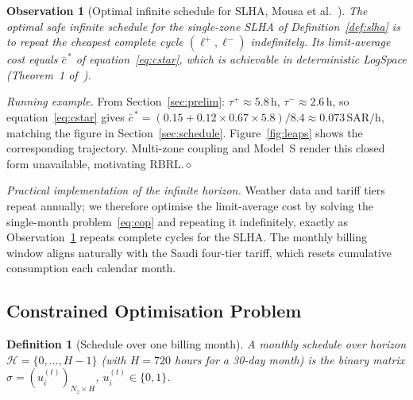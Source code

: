 \documentclass[12pt,a4paper]{article}
\let\oldsubsection\subsection
\renewcommand{\subsection}[1]{\FloatBarrier\oldsubsection{#1}}
\newtheorem{definition}{Definition}
\newtheorem{observation}{Observation}
\newcommand{\sched}{\sigma}
\newcommand{\SAR}{\text{SAR}}
\newcommand{\taup}{\tau^{+}}
\newcommand{\taum}{\tau^{-}}
\begin{document}
\begin{observation}[Optimal infinite schedule for SLHA, Mousa et al.~\cite{Mousa2018}]
\label{obs:optimal}
The optimal safe infinite schedule for the single-zone SLHA of
Definition~\ref{def:slha} is to repeat the cheapest complete cycle
$(\ell^+,\ell^-)$ indefinitely.
Its limit-average cost equals $\bar{c}^{\,*}$ of equation~\eqref{eq:cstar},
which is achievable in deterministic LogSpace (Theorem~1 of~\cite{Mousa2018}).
\end{observation}

\noindent\textit{Running example.}\;
From Section~\ref{sec:prelim}: $\taup{\approx}5.8\,\text{h}$,
$\taum{\approx}2.6\,\text{h}$, so equation~\eqref{eq:cstar} gives
$\bar{c}^{\,*}=(0.15+0.12{\times}0.67{\times}5.8)/8.4\approx0.073\,\SAR/\text{h}$,
matching the figure in Section~\ref{sec:schedule}.
Figure~\ref{fig:leaps} shows the corresponding trajectory.
Multi-zone coupling and Model~S render this closed form unavailable,
motivating RBRL.\hfill$\diamond$

\emph{Practical implementation of the infinite horizon.}
Weather data and tariff tiers repeat annually; we therefore optimise the
limit-average cost by solving the single-month
problem~\eqref{eq:cop} and repeating it indefinitely, exactly as
Observation~\ref{obs:optimal} repeats complete cycles for the SLHA.
The monthly billing window aligns naturally with the Saudi four-tier
tariff, which resets cumulative consumption each calendar month.

\subsection{Constrained Optimisation Problem}
\label{subsec:cop}

\begin{definition}[Schedule over one billing month]
\label{def:schedule}
A \emph{monthly schedule} over horizon $\mathcal{H}=\{0,\ldots,H-1\}$
(with $H=720$ hours for a 30-day month) is the binary matrix
$\sched=(u_i^{(t)})_{N_z\times H}$, $u_i^{(t)}\in\{0,1\}$.
\end{definition}
\end{document}
